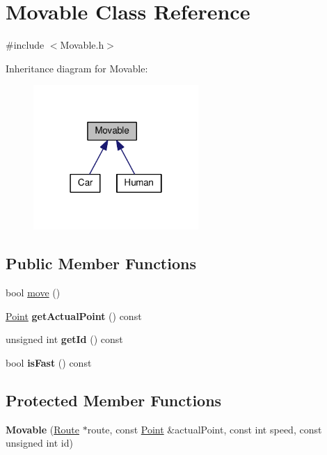 \hypertarget{classMovable}{\section{Movable Class Reference}
\label{classMovable}
}


{\ttfamily \#include $<$Movable.\-h$>$}



Inheritance diagram for Movable\-:
\nopagebreak
\begin{figure}[H]
\begin{center}
\leavevmode
\includegraphics[width=178pt]{classMovable__inherit__graph}
\end{center}
\end{figure}
\subsection*{Public Member Functions}
\begin{DoxyCompactItemize}
\item 
bool \hyperlink{classMovable_afa3a7396ff6f8c5f5e51a0aeedfa332c}{move} ()
\item 
\hypertarget{classMovable_a03706cb151f6980ff79009749e26afe2}{\hyperlink{classPoint}{Point} {\bfseries get\-Actual\-Point} () const }\label{classMovable_a03706cb151f6980ff79009749e26afe2}

\item 
\hypertarget{classMovable_a5dbdb0881b07bff3faf68260bdb0b807}{unsigned int {\bfseries get\-Id} () const }\label{classMovable_a5dbdb0881b07bff3faf68260bdb0b807}

\item 
\hypertarget{classMovable_a1387ca11bd61513eb6e99d6ecd0b2de1}{bool {\bfseries is\-Fast} () const }\label{classMovable_a1387ca11bd61513eb6e99d6ecd0b2de1}

\end{DoxyCompactItemize}
\subsection*{Protected Member Functions}
\begin{DoxyCompactItemize}
\item 
\hypertarget{classMovable_a61c1152cca500d1f509afef590765ac7}{{\bfseries Movable} (\hyperlink{classRoute}{Route} $\ast$route, const \hyperlink{classPoint}{Point} \&actual\-Point, const int speed, const unsigned int id)}\label{classMovable_a61c1152cca500d1f509afef590765ac7}

\end{DoxyCompactItemize}


